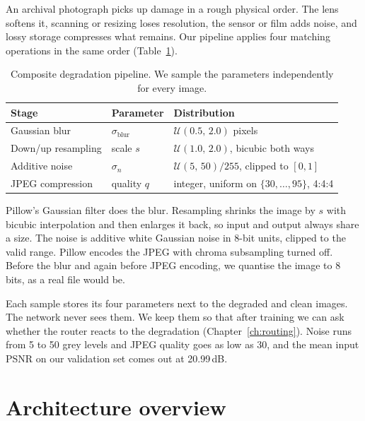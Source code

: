 \documentclass[12pt,a4paper,oneside]{NITR}
\newcommand{\dB}{\,dB}
\begin{document}
An archival photograph picks up damage in a rough physical order. The lens
softens it, scanning or resizing loses resolution, the sensor or film adds
noise, and lossy storage compresses what remains. Our pipeline applies four
matching operations in the same order (Table~\ref{tab:degradation}).
\begin{table}[htbp]
	\centering
	\caption{Composite degradation pipeline. We sample the parameters independently for every image.}
	\label{tab:degradation}
	\begin{tabular}{@{}lll@{}}
		\toprule
		Stage & Parameter & Distribution \\
		\midrule
		Gaussian blur        & $\sigma_\text{blur}$ & $\mathcal{U}(0.5,\, 2.0)$ pixels \\
		Down/up resampling   & scale $s$            & $\mathcal{U}(1.0,\, 2.0)$, bicubic both ways \\
		Additive noise       & $\sigma_n$           & $\mathcal{U}(5,\, 50)/255$, clipped to $[0,1]$ \\
		JPEG compression     & quality $q$          & integer, uniform on $\{30,\dots,95\}$, 4:4:4 \\
		\bottomrule
	\end{tabular}
\end{table}

Pillow's Gaussian filter does the blur. Resampling shrinks the image by $s$
with bicubic interpolation and then enlarges it back, so input and output
always share a size. The noise is additive white Gaussian noise in 8-bit
units, clipped to the valid range. Pillow encodes the JPEG with chroma
subsampling turned off. Before the blur and again before JPEG encoding, we
quantise the image to 8 bits, as a real file would be.

Each sample stores its four parameters next to the degraded and clean
images. The network never sees them. We keep them so that after training we
can ask whether the router reacts to the degradation
(Chapter~\ref{ch:routing}). Noise runs from 5 to 50 grey levels and JPEG
quality goes as low as 30, and the mean input PSNR on our validation set
comes out at 20.99\dB{}.

\section{Architecture overview}\label{sec:arch}
\end{document}
